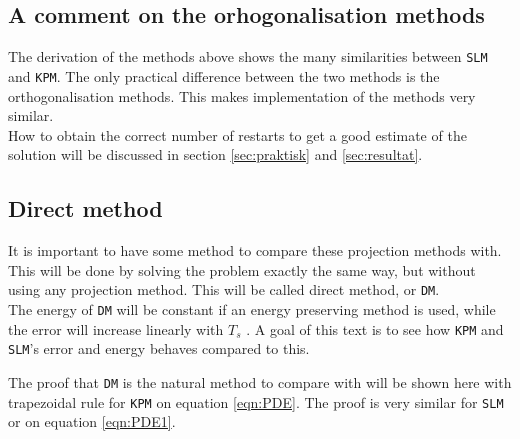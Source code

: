 \subsection{A comment on the orhogonalisation methods} %
The  derivation of the methods above shows the many similarities between \texttt{SLM} and \texttt{KPM}. The only practical difference between the two methods is the orthogonalisation methods. This makes implementation of the methods very similar.  \\

\noindent How to obtain the correct number of restarts to get a good estimate of the solution will be discussed in section \ref{sec:praktisk} and \ref{sec:resultat}.

\subsection{Direct method} \label{sec:DM}
It is important to have some method to compare these projection methods with. This will be done by solving the problem exactly the same way, but without using any projection method. This will be called direct method, or \texttt{DM}. \\

\noindent The energy of \texttt{DM} will be constant if an energy preserving method is used, while the error will increase linearly with $T_s$ \cite{linearerrorgrowth}. A goal of this text is to see how \texttt{KPM} and \texttt{SLM}'s error and energy behaves compared to this. 

\noindent The proof that \texttt{DM} is the natural method to compare with will be shown here with trapezoidal rule for \texttt{KPM} on equation \eqref{eqn:PDE}. The proof is very similar for \texttt{SLM} or on equation \eqref{eqn:PDE1}. \\

